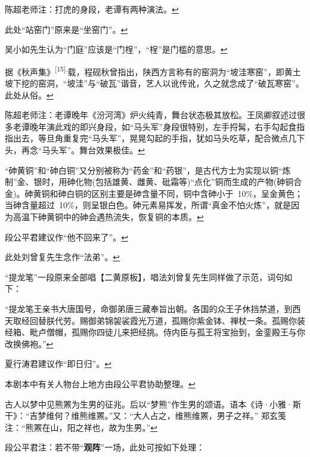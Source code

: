 \item
  \leavevmode\hypertarget{fn351}{}%
  陈超老师注：打虎的身段，老谭有两种演法。\protect\hyperlink{fnref351}{↩}
\item
  \leavevmode\hypertarget{fn352}{}%
  此处``站窑门''原来是``坐窑门''。\protect\hyperlink{fnref352}{↩}
\item
  \leavevmode\hypertarget{fn353}{}%
  吴小如先生认为``门庭''应该是``门桯''，``桯''是门槛的意思。\protect\hyperlink{fnref353}{↩}
\item
  \leavevmode\hypertarget{fn354}{}%
  据《秋声集》\textsuperscript{{[}15{]}.}载，程砚秋曾指出，陕西方言称有的窑洞为``坡洼寒窑''，即黄土坡下挖的窑洞，``坡洼''与``破瓦''谐音，艺人以讹传讹，久之就念成了``破瓦寒窑''。此处从俗。\protect\hyperlink{fnref354}{↩}
\item
  \leavevmode\hypertarget{fn355}{}%
  陈超老师注：老谭晚年《汾河湾》炉火纯青，舞台状态极其放松。王凤卿叙述过很多老谭晚年演此戏的即兴身段，如``马头军''身段很特别，左手捋髯，右手勾起食指指出去，等旦角重复完``马头军''，晃晃勾起的手指，犹如马头吃草，配合微点几下头，再念``马头军''。舞台效果极佳。\protect\hyperlink{fnref355}{↩}
\item
  \leavevmode\hypertarget{fn356}{}%
  ``砷黄铜''和``砷白铜''又分别被称为``药金''和``药银''，是古代方士为实现以铜``炼制''金、银时，用砷化物(包括雄黄、雌黄、砒霜等)``点化''铜而生成的产物(砷铜合金)。砷黄铜和砷白铜的区别主要是砷含量不同，铜中含砷小于~10\%，呈金黄色；当砷含量超过~10\%，则呈银白色。砷元素易挥发，所谓``真金不怕火炼''，就是因为高温下砷黄铜中的砷会遇热流失，恢复铜的本质。\protect\hyperlink{fnref356}{↩}
\item
  \leavevmode\hypertarget{fn357}{}%
  段公平君建议作``他不回来了''。\protect\hyperlink{fnref357}{↩}
\item
  \leavevmode\hypertarget{fn358}{}%
  此处刘曾复先生念作``法弟''。\protect\hyperlink{fnref358}{↩}
\item
  \leavevmode\hypertarget{fn359}{}%
  ``提龙笔''一段原来全部唱【二黄原板】，唱法刘曾复先生同样做了示范，词句如下：

  ``提龙笔王亲书大唐国号，命御弟唐三藏奉旨出朝。各国的众王子休挡禁道，到西天取经回替朕代劳。赐御弟锦袈裟霞光万道，孤赐你紫金钵、禅杖一条。孤赐你装经箱、毗卢僧帽，孤赐你四徒儿来把经挑。侍内臣与孤王将宝抬到，金銮殿王与你改换佛袍。''\protect\hyperlink{fnref359}{↩}
\item
  \leavevmode\hypertarget{fn360}{}%
  夏行涛君建议作``即日归''。\protect\hyperlink{fnref360}{↩}
\item
  \leavevmode\hypertarget{fn361}{}%
  本剧本中有关人物台上地方由段公平君协助整理。\protect\hyperlink{fnref361}{↩}
\item
  \leavevmode\hypertarget{fn362}{}%
  古人以梦中见熊罴为生男的征兆。后以``梦熊''作生男的颂语。语本《诗·小雅·斯干》：``吉梦维何？维熊维罴。''又：``大人占之，维熊维罴，男子之祥。''
  郑玄笺注：``熊罴在山，阳之祥也，故为生男。''\protect\hyperlink{fnref362}{↩}
\item
  \leavevmode\hypertarget{fn363}{}%
  段公平君注：若不带``\textbf{观阵}''一场，此处可按如下处理：

